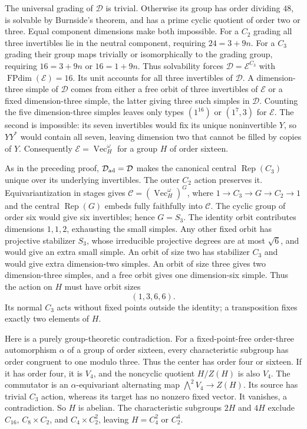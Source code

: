 \documentclass[11pt]{article}
\newcommand{\FPdim}{\operatorname{FPdim}}
\begin{document}
The universal grading of $\mathcal D$ is trivial. Otherwise its group
has order dividing $48$, is solvable by Burnside's theorem, and has a
prime cyclic quotient of order two or three. Equal component dimensions
\cite[Proposition~8.20]{ENO} make both impossible. For a $C_2$ grading
all three invertibles lie in the neutral component, requiring
$24=3+9n$. For a $C_3$ grading their group maps trivially or isomorphically
to the grading group, requiring $16=3+9n$ or $16=1+9n$.
Thus solvability forces $\mathcal D=\mathcal E^{C_3}$ with
$\FPdim(\mathcal E)=16$. Its unit accounts for all three invertibles
of $\mathcal D$. A dimension-three simple of $\mathcal D$ comes from
either a free orbit of three invertibles of $\mathcal E$ or a fixed
dimension-three simple, the latter giving three such simples in
$\mathcal D$. Counting the five dimension-three simples leaves only
types $(1^{16})$ or $(1^7,3)$ for $\mathcal E$. The second is impossible:
its seven invertibles would fix its unique noninvertible $Y$, so
$YY^*$ would contain all seven, leaving dimension two that cannot be
filled by copies of $Y$. Consequently
$\mathcal E=\operatorname{Vec}_H^\omega$ for a group $H$ of order sixteen.

As in the preceding proof, $\mathcal D_{\rm ad}=\mathcal D$ makes the
canonical central $\operatorname{Rep}(C_3)$ unique over its underlying
invertibles. The outer $C_2$ action preserves it. Equivariantization
in stages gives $\mathcal C=(\operatorname{Vec}_H^\omega)^G$, where
$1\to C_3\to G\to C_2\to1$ and the central
$\operatorname{Rep}(G)$ embeds fully faithfully into $\mathcal C$.
The cyclic group of order six would give six invertibles; hence $G=S_3$.
The identity orbit contributes dimensions $1,1,2$, exhausting the small
simples. Any other fixed orbit has projective stabilizer $S_3$, whose
irreducible projective degrees are at most $\sqrt6$, and would give an
extra small simple. An orbit of size two has stabilizer $C_3$ and would
give extra dimension-two simples. An orbit of size three gives two
dimension-three simples, and a free orbit gives one dimension-six simple.
Thus the action on $H$ must have orbit sizes
\[
 (1,3,6,6).
\]
Its normal $C_3$ acts without fixed points outside the identity; a
transposition fixes exactly two elements of $H$.

Here is a purely group-theoretic contradiction. For a fixed-point-free
order-three automorphism $\alpha$ of a group of order sixteen, every
characteristic subgroup has order congruent to one modulo three.
Thus the center has order four or sixteen. If it has order four, it
is $V_4$, and the noncyclic quotient $H/Z(H)$ is also $V_4$.
The commutator is an $\alpha$-equivariant alternating map
$\bigwedge^2V_4\to Z(H)$. Its source has trivial $C_3$ action, whereas
its target has no nonzero fixed vector. It vanishes, a contradiction.
So $H$ is abelian. The characteristic subgroups $2H$ and $4H$ exclude
$C_{16}$, $C_8\times C_2$, and $C_4\times C_2^2$, leaving
$H=C_4^2$ or $C_2^4$.
\end{document}
